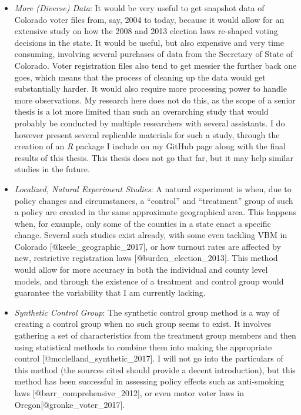 \documentclass[]{article}
\begin{document}
\begin{itemize}
\item
  \emph{More (Diverse) Data}: It would be very useful to get snapshot
  data of Colorado voter files from, say, 2004 to today, because it
  would allow for an extensive study on how the 2008 and 2013 election
  laws re-shaped voting decisions in the state. It would be useful, but
  also expensive and very time consuming, involving several purchases of
  data from the Secretary of State of Colorado. Voter registration files
  also tend to get messier the further back one goes, which means that
  the process of cleaning up the data would get substantially harder. It
  would also require more processing power to handle more observations.
  My research here does not do this, as the scope of a senior thesis is
  a lot more limited than such an overarching study that would probably
  be conducted by multiple researchers with several assistants. I do
  however present several replicable materials for such a study, through
  the creation of an \textit{R} package I include on my GitHub page
  along with the final results of this thesis. This thesis does not go
  that far, but it may help similar studies in the future.
\item
  \emph{Localized, Natural Experiment Studies}: A natural experiment is
  when, due to policy changes and circumstances, a ``control'' and
  ``treatment'' group of such a policy are created in the same
  approximate geographical area. This happens when, for example, only
  some of the counties in a state enact a specific change. Several such
  studies exist already, with some even tackling VBM in Colorado
  {[}@keele\_geographic\_2017{]}, or how turnout rates are affected by
  new, restrictive registration laws {[}@burden\_election\_2013{]}. This
  method would allow for more accuracy in both the individual and county
  level models, and through the existence of a treatment and control
  group would guarantee the variability that I am currently lacking.
\item
  \emph{Synthetic Control Group}: The synthetic control group method is
  a way of creating a control group when no such group seems to exist.
  It involves gathering a set of characteristics from the treatment
  group members and then using statistical methods to combine them into
  making the appropriate control {[}@mcclelland\_synthetic\_2017{]}. I
  will not go into the particulars of this method (the sources cited
  should provide a decent introduction), but this method has been
  successful in assessing policy effects such as anti-smoking laws
  {[}@barr\_comprehensive\_2012{]}, or even motor voter laws in
  Oregon{[}@gronke\_voter\_2017{]}.
\end{itemize}
\end{document}
